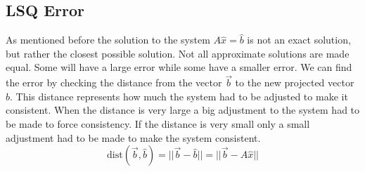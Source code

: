 \documentclass[11pt, a4paper]{article}
\begin{document}
\subsection{LSQ Error}
As mentioned before the solution to the system $A\hat{x}=\hat{b}$ is not an exact solution, but rather the closest possible solution. Not all approximate solutions are made equal. Some will have a large error while some have a smaller error. We can find the error by checking the distance from the vector $\vec{b}$ to the new projected vector $\hat{b}$. This distance represents how much the system had to be adjusted to make it consistent. When the distance is very large a big adjustment to the system had to be made to force consistency. If the distance is very small only a small adjustment had to be made to make the system consistent.
\begin{equation}
  \text{dist}(\vec{b},\hat{b}) = ||\vec{b}-\hat{b}|| = ||\vec{b} - A\hat{x}||
\end{equation}
\end{document}

